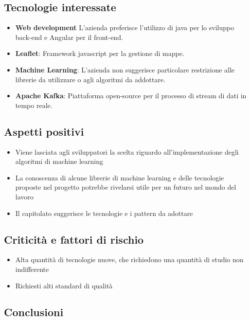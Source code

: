 \subsection{Tecnologie interessate}
\begin{itemize}
    \item \textbf{Web development} L'azienda preferisce l'utilizzo di java per lo sviluppo back-end e Angular per il front-end.
    \item \textbf{Leaflet}: Framework javascript per la gestione di mappe.
    \item \textbf{Machine Learning}: L'azienda non suggerisce particolare restrizione alle librerie da utilizzare o agli algoritmi da addottare.
    \item \textbf{Apache Kafka}: Piattaforma open-source per il processo di stream di dati in tempo reale.
\end{itemize}
\subsection{Aspetti positivi}
\begin{itemize}
    \item Viene lasciata agli sviluppatori la scelta riguardo all'implementazione degli algoritmi di machine learning
    \item La conoscenza di alcune librerie di machine learning e delle tecnologie proposte nel progetto potrebbe rivelarsi utile per un futuro nel mondo del lavoro
    \item Il capitolato suggerisce le tecnologie e i pattern da adottare
\end{itemize}
\subsection{Criticità e fattori di rischio}
\begin{itemize}
    \item Alta quantità di tecnologie nuove, che richiedono una quantità di studio non indifferente
    \item Richiesti alti standard di qualità
\end{itemize}
\subsection{Conclusioni}